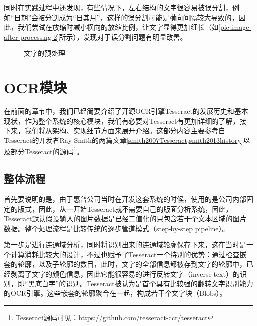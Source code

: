 同时在实践过程中还发现，有些情况下，左右结构的文字很容易被误分割，例如“日期”会被分割成为“日其月”，这样的误分割可能是横向间隔较大导致的，因此，我们尝试在放缩时减小横向的放缩比例，让文字显得更加细长（如\autoref{pic:image-after-processing-2}所示），发现对于误分割问题有明显改善。
\begin{figure}[htbp]
  \centering
	\hfill
	\hfill
  \caption{文字的预处理}
  \label{pic:pre-processing}
\end{figure}

\section{OCR模块}     %
在前面的章节中，我们已经简要介绍了开源OCR引擎Tesseract的发展历史和基本现状，作为整个系统的核心模块，我们有必要对Tesseract有更加详细的了解，接下来，我们将从架构、实现细节方面来展开介绍。这部分内容主要参考自Tesseract的开发者Ray Smith的两篇文章\autoref{smith2007Tesseract,smith2013history}以及部分Tesseract的源码\footnote{Tesseract源码可见：https://github.com/tesseract-ocr/tesseract}。

\subsection{整体流程}
首先要说明的是，由于惠普公司当时在开发这套系统的时候，使用的是公司内部固定的版式，因此，从一开始Tesseract就不需要自己的版面分析系统，因此，Tesseract默认假设输入的图片数据是已经二值化的只包含若干个文本区域的图片数据。整个处理流程是比较传统的逐步管道模式（step-by-step pipeline）。

第一步是进行连通域分析，同时将识别出来的连通域轮廓保存下来，这在当时是一个计算消耗比较大的设计，不过也赋予了Tesseract一个特别的优势：通过检查嵌套的轮廓，以及子轮廓的数目，此时，文字的全部信息都被存到文字的轮廓中，已经剥离了文字的颜色信息，因此它能很容易的进行反转文字（inverse text）的识别，即“黑底白字”的识别。Tesseract被认为是首个具有比较强的翻转文字识别能力的OCR引擎。这些嵌套的轮廓聚合在一起，构成若干个文字块（Blobs）。

